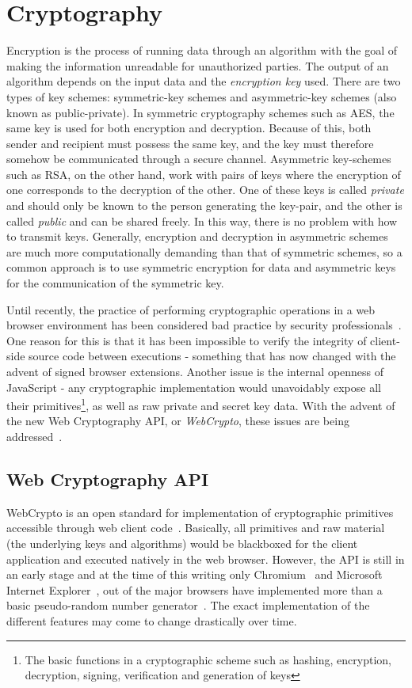 \section{Cryptography}
\label{sec:techcryptography}
Encryption is the process of running data through an algorithm with the goal of making the information unreadable for unauthorized parties. The output of an algorithm depends on the input data and the \emph{encryption key} used. There are two types of key schemes: symmetric-key schemes and asymmetric-key schemes (also known as public-private). In symmetric cryptography  schemes such as AES, the same key is used for both encryption and decryption. Because of this, both sender and recipient must possess the same key, and the key must therefore somehow be communicated through a secure channel. Asymmetric key-schemes such as RSA, on the other hand, work with pairs of keys where the encryption of one corresponds to the decryption of the other. One of these keys is called \emph{private} and should only be known to the person generating the key-pair, and the other is called \emph{public} and can be shared freely. In this way, there is no problem with how to transmit keys. Generally, encryption and decryption in asymmetric schemes are much more computationally demanding than that of symmetric schemes, so a common approach is to use symmetric encryption for data and asymmetric keys for the communication of the symmetric key.

Until recently, the practice of performing cryptographic operations in a web browser environment has been considered bad practice by security professionals~\cite{Matasano:Online}. One reason for this is that it has been impossible to verify the integrity of client-side source code between executions - something that has now changed with the advent of signed browser extensions. Another issue is the internal openness of JavaScript - any cryptographic implementation would unavoidably expose all their primitives\footnote{The basic functions in a cryptographic scheme such as hashing, encryption, decryption, signing, verification and generation of keys}, as well as raw private and secret key data. With the advent of the new Web Cryptography API, or \emph{WebCrypto}, these issues are being addressed~\cite{WebCrypto:Online}.

\subsection{Web Cryptography API}
WebCrypto is an open standard for implementation of cryptographic primitives accessible through web client code~\cite{WebCrypto:Online}. Basically, all primitives and raw material (the underlying keys and algorithms) would be blackboxed for the client application and executed natively in the web browser. However, the API is still in an early stage and at the time of this writing only Chromium~\cite{ImplementedChromium:Online} and Microsoft Internet Explorer~\cite{WCAImplementationMicrosoft:Online}, out of the major browsers have implemented more than a basic pseudo-random number generator~\cite{WCAImplementationMozilla:Online}. The exact implementation of the different features may come to change drastically over time.

